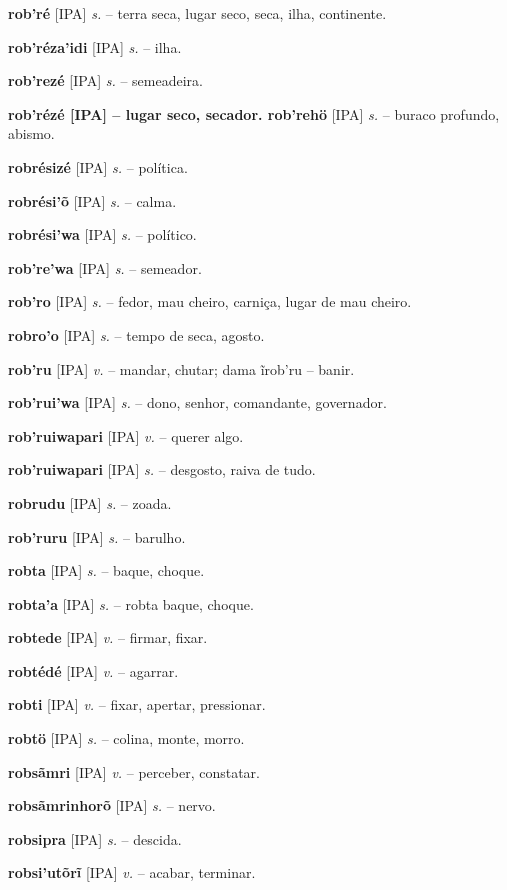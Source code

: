 \textbf{rob'ré} [IPA] \textit{s.} -- terra seca, lugar seco, seca, ilha, continente.

\textbf{rob'réza'idi} [IPA] \textit{s.} -- ilha.

\textbf{rob'rezé} [IPA] \textit{s.} -- semeadeira.

\textbf{rob'rézé [IPA]  -- lugar seco, secador. rob'rehö} [IPA] \textit{s.} -- buraco profundo, abismo.

\textbf{robrésizé} [IPA] \textit{s.} -- política.

\textbf{robrési'õ} [IPA] \textit{s.} -- calma.

\textbf{robrési'wa} [IPA] \textit{s.} -- político.

\textbf{rob're'wa} [IPA] \textit{s.} -- semeador.

\textbf{rob'ro} [IPA] \textit{s.} -- fedor, mau cheiro, carniça, lugar de mau cheiro.

\textbf{robro'o} [IPA] \textit{s.} -- tempo de seca, agosto.

\textbf{rob'ru} [IPA] \textit{v.} -- mandar, chutar; dama ĩrob'ru -- banir.

\textbf{rob'rui'wa} [IPA] \textit{s.} -- dono, senhor, comandante, governador.

\textbf{rob'ruiwapari} [IPA] \textit{v.} -- querer algo.

\textbf{rob'ruiwapari} [IPA] \textit{s.} -- desgosto, raiva de tudo.

\textbf{robrudu} [IPA] \textit{s.} -- zoada.

\textbf{rob'ruru} [IPA] \textit{s.} -- barulho.

\textbf{robta} [IPA] \textit{s.} -- baque, choque.

\textbf{robta'a} [IPA] \textit{s.} -- robta baque, choque.

\textbf{robtede} [IPA] \textit{v.} -- firmar, fixar.

\textbf{robtédé} [IPA] \textit{v.} -- agarrar.

\textbf{robti} [IPA] \textit{v.} -- fixar, apertar, pressionar.

\textbf{robtö} [IPA] \textit{s.} -- colina, monte, morro.

\textbf{robsãmri} [IPA] \textit{v.} -- perceber, constatar.

\textbf{robsãmrinhorõ} [IPA] \textit{s.} -- nervo.

\textbf{robsipra} [IPA] \textit{s.} -- descida.

\textbf{robsi'utõrĩ} [IPA] \textit{v.} -- acabar, terminar.

